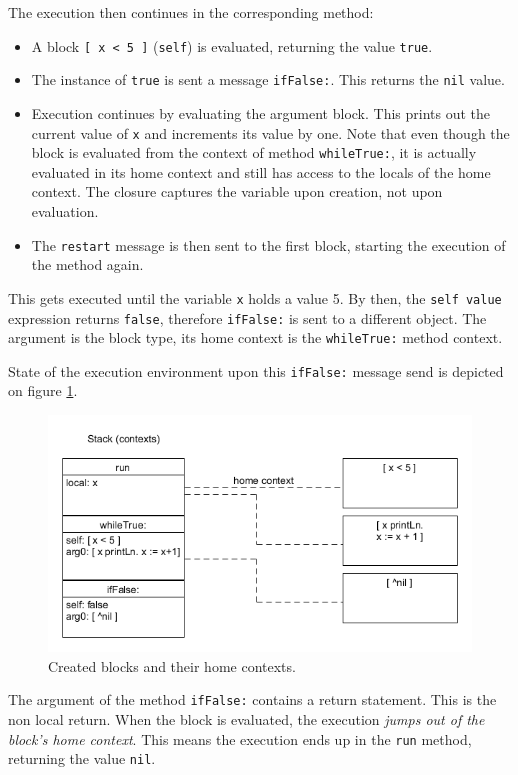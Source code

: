 \documentclass[thesis=M,english]{FITthesis}[2019/12/23]
\begin{document}
The execution then continues in the corresponding method:
\begin{itemize}
	\item A block \texttt{[ x < 5 ]} (\texttt{self}) is evaluated, returning the value \texttt{true}.
	\item The instance of \texttt{true} is sent a message \texttt{ifFalse:}. This returns the \texttt{nil} value.
	\item Execution continues by evaluating the argument block. This prints out the current value of \texttt{x} and
		increments its value by one. Note that even though the block is evaluated from the context of method
		\texttt{whileTrue:}, it is actually evaluated in its home context and still has access to the locals of 
		the home context. The closure captures the variable upon creation, not upon evaluation.
	\item The \texttt{restart} message is then sent to the first block, starting the execution of the method again.
\end{itemize}

This gets executed until the variable \texttt{x} holds a value 5. By then, the \texttt{self value} expression returns
\texttt{false}, therefore \texttt{ifFalse:} is sent to a different object. The argument is the block type, its home context
is the \texttt{whileTrue:} method context.

State of the execution environment upon this \texttt{ifFalse:} message send is depicted on figure \ref{fig:nlreturn_ctx_1}.
\begin{figure}[h!]
	\centering
	\includegraphics[width=\linewidth]{media/nlreturn_ex1.png}
	\caption{Created blocks and their home contexts.}
	\label{fig:nlreturn_ctx_1}
\end{figure}

The argument of the method \texttt{ifFalse:} contains a return statement. This is the non local return. When the block is
evaluated, the execution \textit{jumps out of the block's home context}. This means the execution ends up in the \texttt{run}
method, returning the value \texttt{nil}.
\end{document}
